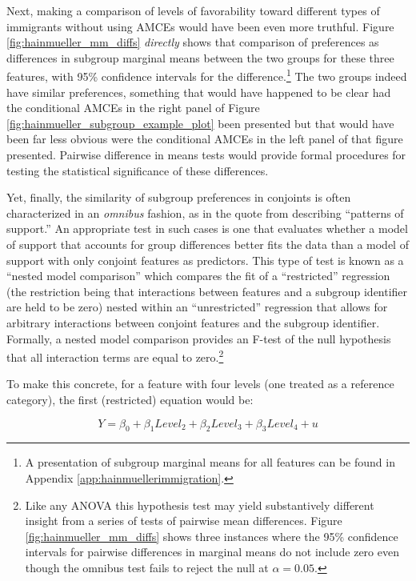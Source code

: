 \documentclass[a4paper,12pt]{article}\usepackage[]{graphicx}\usepackage[]{color}
\begin{document}
Next, making a comparison of levels of favorability toward different types of immigrants without using AMCEs would have been even more truthful. Figure \ref{fig:hainmueller_mm_diffs} \textit{directly} shows that comparison of preferences as differences in subgroup marginal means between the two groups for these three features, with 95\% confidence intervals for the difference.\footnote{A presentation of subgroup marginal means for all features can be found in Appendix \ref{app:hainmuellerimmigration}.} The two groups indeed have similar preferences, something that would have happened to be clear had the conditional AMCEs in the right panel of Figure \ref{fig:hainmueller_subgroup_example_plot} been presented but that would have been far less obvious were the conditional AMCEs in the left panel of that figure presented. Pairwise difference in means tests would provide formal procedures for testing the statistical significance of these differences.

Yet, finally, the similarity of subgroup preferences in conjoints is often characterized in an \textit{omnibus} fashion, as in the quote from \citet{HainmuellerHopkinsYamamoto2014} describing ``patterns of support.'' An appropriate test in such cases is one that evaluates whether a model of support that accounts for group differences better fits the data than a model of support with only conjoint features as predictors. This type of test is known as a ``nested model comparison'' which compares the fit of a ``restricted'' regression (the restriction being that interactions between features and a subgroup identifier are held to be zero) nested within an ``unrestricted'' regression that allows for arbitrary interactions between conjoint features and the subgroup identifier. Formally, a nested model comparison provides an F-test of the null hypothesis that all interaction terms are equal to zero.\footnote{Like any ANOVA this hypothesis test may yield substantively different insight from a series of tests of pairwise mean differences. Figure \ref{fig:hainmueller_mm_diffs} shows three instances where the 95\% confidence intervals for pairwise differences in marginal means do not include zero even though the omnibus test fails to reject the null at $\alpha = 0.05$.}

To make this concrete, for a feature with four levels (one treated as a reference category), the first (restricted) equation would be:

\begin{equation}\label{eq:restricted}
Y = \beta_0 + \beta_1 Level_2 + \beta_2 Level_3 + \beta_3 Level_4 + u
\end{equation}
\end{document}

